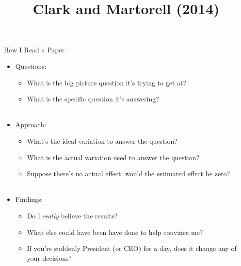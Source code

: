 \documentclass{beamer}
\title{Clark and Martorell (2014)}
\begin{document}
\maketitle
\begin{frame}[<+->]{How I Read a Paper}
\begin{itemize}
\item Questions:
	\begin{itemize}
	\item What is the big picture question it's trying to get at?
	\item What is the specific question it's answering? \\~\\
	\end{itemize}
\item Approach:
	\begin{itemize}
	\item What's the ideal variation to answer the question?
	\item What is the actual variation used to answer the question?
	\item Suppose there's no actual effect: would the estimated effect be zero? \\~\\
	\end{itemize}
\item Findings:
	\begin{itemize}
	\item Do I \emph{really} believe the results?
	\item What else could have been have done to help convince me?
	\item If you're suddenly President (or CEO) for a day, does it change any of your decisions?
	\end{itemize}
\end{itemize}
\end{frame}
\end{document}

